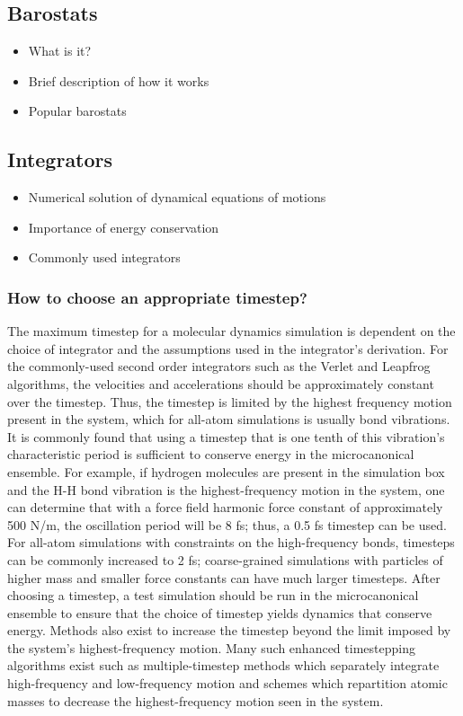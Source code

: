\documentclass[9pt,bestpractices]{livecoms}
\begin{document}
\subsection{Barostats}
\label{sec:barostats}
\begin{itemize}
\item What is it?
\item Brief description of how it works
\item Popular barostats
\end{itemize}

\subsection{Integrators}
\label{sec:integrators}
\begin{itemize}
\item Numerical solution of dynamical equations of motions
\item Importance of energy conservation
\item Commonly used integrators
\end{itemize}
\subsubsection{How to choose an appropriate timestep?}

The maximum timestep for a molecular dynamics simulation is dependent on the choice of integrator and the assumptions used in the integrator's derivation.
For the commonly-used second order integrators such as the Verlet and Leapfrog algorithms, the velocities and accelerations should be approximately constant over the timestep.
Thus, the timestep is limited by the highest frequency motion present in the system, which for all-atom simulations is usually bond vibrations.
It is commonly found that using a timestep that is one tenth of this vibration's characteristic period is sufficient to conserve energy in the microcanonical ensemble.
For example, if hydrogen molecules are present in the simulation box and the H-H bond vibration is the highest-frequency motion in the system, one can determine that with a force field harmonic force constant of approximately 500 N/m, the oscillation period will be 8 fs; thus, a 0.5 fs timestep can be used.
For all-atom simulations with constraints on the high-frequency bonds, timesteps can be commonly increased to 2 fs; coarse-grained simulations with particles of higher mass and smaller force constants can have much larger timesteps.
After choosing a timestep, a test simulation should be run in the microcanonical ensemble to ensure that the choice of timestep yields dynamics that conserve energy.
Methods also exist to increase the timestep beyond the limit imposed by the system's highest-frequency motion.
Many such enhanced timestepping algorithms exist such as multiple-timestep methods which separately integrate high-frequency and low-frequency motion and schemes which repartition atomic masses to decrease the highest-frequency motion seen in the system\cite{Berne:1999:Molecular,Hopkins:2015:JCTC:Long}.
\end{document}
